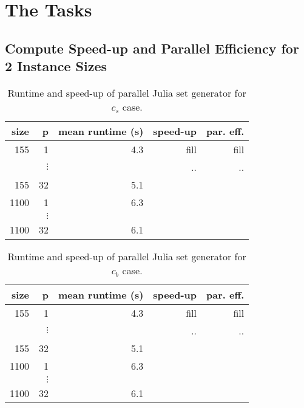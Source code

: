 \documentclass[a4paper,%
11pt,%
DIV12,
headsepline,%
headings=normal,
]{scrartcl}
\begin{document}
\maketitlepage




\setcounter{section}{1}
\section{The Tasks}

\setcounter{subsection}{1}
\subsection{Compute Speed-up and Parallel Efficiency for 2 Instance Sizes }

\def\sizes{155}
\def\sizel{1100}

\begin{table}[htb]
 \centering 
\caption{\label{tab:runtime_cs}Runtime and speed-up of parallel Julia set generator for $c_s$ case.}
\begin{tabular}{rrrrr}
  \toprule
  size & p & mean runtime (s) & speed-up & par. eff.\\
  \midrule
  \sizes & 1 & 4.3 & fill & fill \\
    & $\vdots$ &  & .. & .. \\
  \sizes & 32 & 5.1 &  \\
  \sizel & 1 & 6.3 \\
    & $\vdots$ &  \\
  \sizel & 32 & 6.1 \\
  \bottomrule
\end{tabular}
\end{table}

\begin{table}[htb]
 \centering 
\caption{\label{tab:runtime_cb}Runtime and speed-up of parallel Julia set generator for $c_b$ case.}
\begin{tabular}{rrrrr}
  \toprule
  size & p & mean runtime (s) & speed-up & par. eff.\\
  \midrule
  \sizes & 1 & 4.3 & fill & fill \\
    & $\vdots$ &  & .. & .. \\
  \sizes & 32 & 5.1 &  \\
  \sizel & 1 & 6.3 \\
    & $\vdots$ &  \\
  \sizel & 32 & 6.1 \\
  \bottomrule
\end{tabular}
\end{table}
\end{document}
